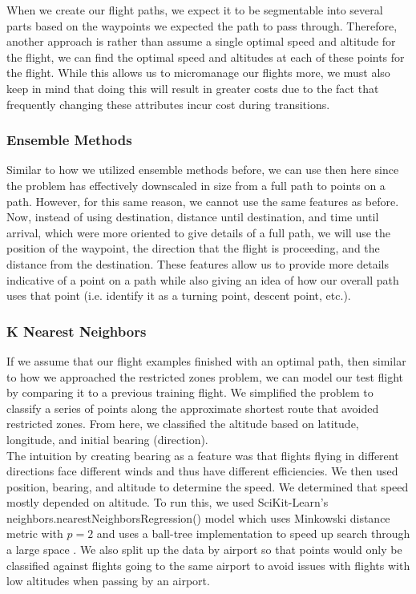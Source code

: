 \documentclass{article}[12pt]
\begin{document}
\begin{multicols}{2}
When we create our flight paths, we expect it to be segmentable into several parts based on the waypoints we expected the path to pass through. Therefore, another approach is rather than assume a single optimal speed and altitude for the flight, we can find the optimal speed and altitudes at each of these points for the flight. While this allows us to micromanage our flights more, we must also keep in mind that doing this will result in greater costs due to the fact that frequently changing these attributes incur cost during transitions.

\subsubsection{Ensemble Methods}

Similar to how we utilized ensemble methods before, we can use then here since the problem has effectively downscaled in size from a full path to points on a path. However, for this same reason, we cannot use the same features as before. Now, instead of using destination, distance until destination, and time until arrival, which were more oriented to give details of a full path, we will use the position of the waypoint, the direction that the flight is proceeding, and the distance from the destination. These features allow us to provide more details indicative of a point on a path while also giving an idea of how our overall path uses that point (i.e. identify it as a turning point, descent point, etc.).

\subsubsection{K Nearest Neighbors}

If we assume that our flight examples finished with an optimal path, then similar to how we approached the restricted zones problem, we can model our test flight by comparing it to a previous training flight. We simplified the problem to classify a series of points along the approximate shortest route that avoided restricted zones. From here, we classified the altitude based on latitude, longitude, and initial bearing (direction).\\

The intuition by creating bearing as a feature was that flights flying in different directions face different winds and thus have different efficiencies. We then used position, bearing, and altitude to determine the speed. We determined that speed mostly depended on altitude. To run this, we used SciKit-Learn's neighbors.nearestNeighborsRegression() model which uses Minkowski distance metric with $p=2$ and uses a ball-tree implementation to speed up search through a large space \cite{scikit}. We also split up the data by airport so that points would only be classified against flights going to the same airport to avoid issues with flights with low altitudes when passing by an airport.


\end{multicols}
\end{document}

